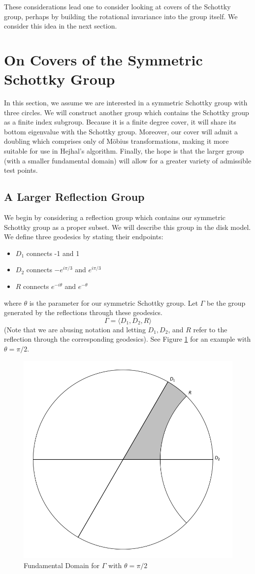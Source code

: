 \documentclass[]{article}
\begin{document}
These considerations lead one to consider looking at covers of the Schottky group, perhaps by building the rotational invariance into the group itself.
We consider this idea in the next section.

\section*{On Covers of the Symmetric Schottky Group}

In this section, we assume we are interested in a symmetric Schottky group with three circles.
We will construct another group which contains the Schottky group as a finite index subgroup.
Because it is a finite degree cover, it will share its bottom eigenvalue with the Schottky group.
Moreover, our cover will admit a doubling which comprises only of M\"obius transformations, making it more suitable for use in Hejhal's algorithm.
Finally, the hope is that the larger group (with a smaller fundamental domain) will allow for a greater variety of admissible test points.

\subsection*{A Larger Reflection Group}

We begin by considering a reflection group which contains our symmetric Schottky group as a proper subset.
We will describe this group in the disk model.
We define three geodesics by stating their endpoints:
\begin{itemize}
	\item $D_1$ connects -1 and 1
	\item $D_2$ connects $-e^{i\pi/3}$ and $e^{i\pi/3}$
	\item $R$ connects $e^{-i\theta}$ and $e^{-\theta}$
\end{itemize}
where $\theta$ is the parameter for our symmetric Schottky group.
Let $\Gamma$ be the group generated by the reflections through these geodesics.
$$
\Gamma = \langle D_1, D_2, R \rangle
$$
(Note that we are abusing notation and letting $D_1, D_2$, and $R$ refer to the reflection through the corresponding geodesics).
See Figure \ref{fd_reflection} for an example with $\theta = \pi/2$.
\begin{figure}
	\centering
	\includegraphics[width=0.5\linewidth]{reflection_group.png}
	\caption{Fundamental Domain for $\Gamma$ with $\theta = \pi/2$}
	\label{fd_reflection}
\end{figure}
\end{document}
